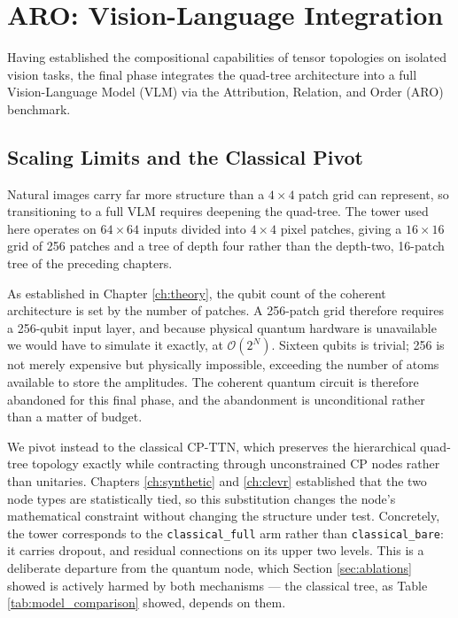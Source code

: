 \documentclass[12pt, a4paper, oneside]{report}
\begin{document}
\chapter{ARO: Vision-Language Integration}
\label{ch:aro}

Having established the compositional capabilities of tensor topologies on isolated vision tasks, the final phase integrates the quad-tree architecture into a full Vision-Language Model (VLM) via the Attribution, Relation, and Order (ARO) benchmark. 

\section{Scaling Limits and the Classical Pivot}

Natural images carry far more structure than a $4 \times 4$ patch grid can represent, so transitioning to a full VLM requires deepening the quad-tree. The tower used here operates on $64 \times 64$ inputs divided into $4 \times 4$ pixel patches, giving a $16 \times 16$ grid of 256 patches and a tree of depth four rather than the depth-two, 16-patch tree of the preceding chapters.

As established in Chapter \ref{ch:theory}, the qubit count of the coherent architecture is set by the number of patches. A 256-patch grid therefore requires a 256-qubit input layer, and because physical quantum hardware is unavailable we would have to simulate it exactly, at $\mathcal{O}(2^N)$. Sixteen qubits is trivial; 256 is not merely expensive but physically impossible, exceeding the number of atoms available to store the amplitudes. The coherent quantum circuit is therefore abandoned for this final phase, and the abandonment is unconditional rather than a matter of budget.

We pivot instead to the classical CP-TTN, which preserves the hierarchical quad-tree topology exactly while contracting through unconstrained CP nodes rather than unitaries. Chapters \ref{ch:synthetic} and \ref{ch:clevr} established that the two node types are statistically tied, so this substitution changes the node's mathematical constraint without changing the structure under test. Concretely, the tower corresponds to the \texttt{classical\_full} arm rather than \texttt{classical\_bare}: it carries dropout, and residual connections on its upper two levels. This is a deliberate departure from the quantum node, which Section \ref{sec:ablations} showed is actively harmed by both mechanisms --- the classical tree, as Table \ref{tab:model_comparison} showed, depends on them.
\end{document}
